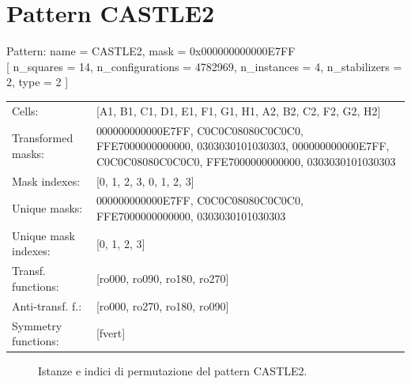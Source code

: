\newpage

\section{Pattern CASTLE2}

\begin{tcolorbox}[sharp corners, fontupper=\ttfamily\small, colback=white]
  \noindent Pattern: name = CASTLE2, mask = 0x000000000000E7FF\\
  {[} n\_squares = 14, n\_configurations = 4782969,
  n\_instances = 4, n\_stabilizers = 2, type = 2 { ]}\\[1.0ex]
  \begin{tabularx}{\textwidth}{@{} p{3.5cm} X @{}}
    Cells:               & {[}A1, B1, C1, D1, E1, F1, G1, H1, A2, B2, C2, F2, G2, H2{]}\\[0.5ex]
    Transformed masks:   & 000000000000E7FF, C0C0C08080C0C0C0, FFE7000000000000, 0303030101030303, 000000000000E7FF, C0C0C08080C0C0C0, FFE7000000000000, 0303030101030303\\[0.5ex]
    Mask indexes:        & {[}0, 1, 2, 3, 0, 1, 2, 3{]}\\[0.5ex]
    Unique masks:        & 000000000000E7FF, C0C0C08080C0C0C0, FFE7000000000000, 0303030101030303\\[0.5ex]
    Unique mask indexes: & {[}0, 1, 2, 3{]}\\[0.5ex]
    Transf. functions:   & {[}ro000, ro090, ro180, ro270{]}\\[0.5ex]
    Anti-transf. f.:     & {[}ro000, ro270, ro180, ro090{]}\\[0.5ex]
    Symmetry functions:  & {[}fvert{]}\\[0.5ex]
  \end{tabularx}
\end{tcolorbox}

\begin{figure}[htbp]
  \centering
   \hfill
   \hfill
   \hfill
  \vspace{0.3cm}
   \hfill
   \hfill
   \hfill
  \caption{Istanze e indici di permutazione del pattern CASTLE2.}
\end{figure}

